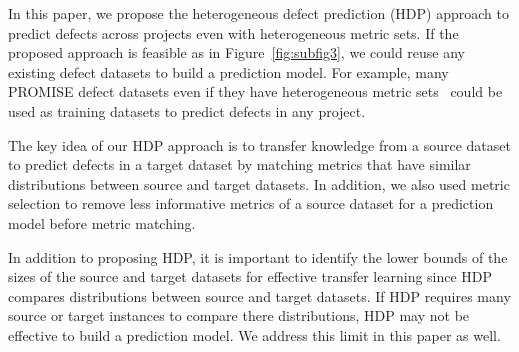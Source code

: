 % 





In this paper, we propose the heterogeneous defect prediction (HDP) approach
to predict defects across projects even with heterogeneous metric
sets.
If the proposed approach is feasible as in
Figure~\ref{fig:subfig3}, we could reuse any existing defect
datasets to build a prediction model. For example, many PROMISE defect datasets
even if they have heterogeneous metric sets~\cite{promise12} could be used as
training datasets to predict defects in any project.

The key idea of our HDP approach is to transfer knowledge from a source dataset to predict defects in a target dataset by matching metrics that have
similar distributions between source and target datasets. In addition, we also
used metric selection to remove less informative metrics of a source dataset
for a prediction model before metric matching.

In addition to proposing HDP, it is important to identify the lower bounds of the sizes of the source and target datasets for effective transfer learning since HDP compares distributions between source and target datasets. 
If HDP requires many source or target instances to compare there distributions, HDP may not be effective to build a prediction model. We address this limit in this paper as well.


